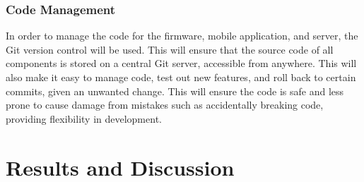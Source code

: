\documentclass[12pt,openany,a4paper]{book}
\begin{document}
\subsection{Code Management}

In order to manage the code for the firmware, mobile application, and server,
the Git version control will be used. This will ensure that the source code of
all components is stored on a central Git server, accessible from anywhere. This
will also make it easy to manage code, test out new features, and roll back to
certain commits, given an unwanted change. This will ensure the code is safe and
less prone to cause damage from mistakes such as accidentally breaking code,
providing flexibility in development.



\cleardoublepage

\chapter{Results and Discussion}


\end{document}
